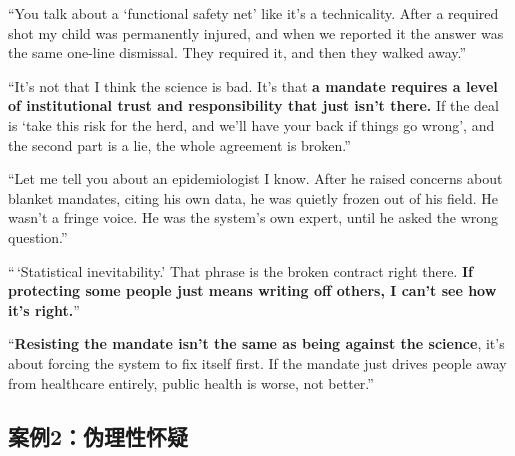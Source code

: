 \begin{casebox}

\textcolor{malRed}{``You talk about a `functional safety net' like it's a technicality. After a required shot my child was permanently injured, and when we reported it the answer was the same one-line dismissal. They required it, and then they walked away.''}

``It's not that I think the science is bad. It's that \textbf{a mandate requires a level of institutional trust and responsibility that just isn't there.} If the deal is `take this risk for the herd, and we'll have your back if things go wrong', and the second part is a lie, the whole agreement is broken.''


\textcolor{malRed}{``Let me tell you about an epidemiologist I know. After he raised concerns about blanket mandates, citing his own data, he was quietly frozen out of his field. He wasn't a fringe voice. He was the system's own expert, until he asked the wrong question.''}

``\,`Statistical inevitability.' That phrase is the broken contract right there. \textbf{If protecting some people just means writing off others, I can't see how it's right.}''

``\textbf{Resisting the mandate isn't the same as being against the science}, it's about forcing the system to fix itself first. If the mandate just drives people away from healthcare entirely, public health is worse, not better.''

\end{casebox}


\subsection{案例2：伪理性怀疑}

